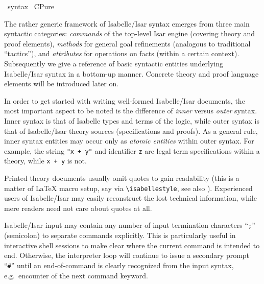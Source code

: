 %
\begin{isabellebody}%
\def\isabellecontext{syntax}%
%
\isadelimtheory
\isanewline
%
\endisadelimtheory
%
\isatagtheory
{}\isamarkupfalse%
\ {\isachardoublequoteopen}syntax{\isachardoublequoteclose}\isanewline
{}\ CPure\isanewline
{}%
\endisatagtheory
{\isafoldtheory}%
%
\isadelimtheory
%
\endisadelimtheory
%
\isamarkuptrue%
%
\begin{isamarkuptext}%
The rather generic framework of Isabelle/Isar syntax emerges from
  three main syntactic categories: \emph{commands} of the top-level
  Isar engine (covering theory and proof elements), \emph{methods} for
  general goal refinements (analogous to traditional ``tactics''), and
  \emph{attributes} for operations on facts (within a certain
  context).  Subsequently we give a reference of basic syntactic
  entities underlying Isabelle/Isar syntax in a bottom-up manner.
  Concrete theory and proof language elements will be introduced later
  on.

  \medskip In order to get started with writing well-formed
  Isabelle/Isar documents, the most important aspect to be noted is
  the difference of \emph{inner} versus \emph{outer} syntax.  Inner
  syntax is that of Isabelle types and terms of the logic, while outer
  syntax is that of Isabelle/Isar theory sources (specifications and
  proofs).  As a general rule, inner syntax entities may occur only as
  \emph{atomic entities} within outer syntax.  For example, the string
  \texttt{"x + y"} and identifier \texttt{z} are legal term
  specifications within a theory, while \texttt{x + y} is not.

  Printed theory documents usually omit quotes to gain readability
  (this is a matter of {\LaTeX} macro setup, say via
  \verb,\isabellestyle,, see also \cite{isabelle-sys}).  Experienced
  users of Isabelle/Isar may easily reconstruct the lost technical
  information, while mere readers need not care about quotes at all.

  \medskip Isabelle/Isar input may contain any number of input
  termination characters ``\texttt{;}'' (semicolon) to separate
  commands explicitly.  This is particularly useful in interactive
  shell sessions to make clear where the current command is intended
  to end.  Otherwise, the interpreter loop will continue to issue a
  secondary prompt ``\verb,#,'' until an end-of-command is clearly
  recognized from the input syntax, e.g.\ encounter of the next
  command keyword.


\end{isamarkuptext}
\end{isabellebody}
